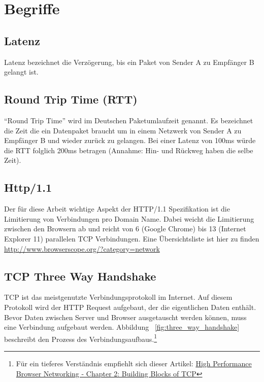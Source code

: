
\section{Begriffe}
\label{sec:begriffe}

	\subsection{Latenz} %
	\label{sub:latenz}
		Latenz bezeichnet die Verzögerung, bis ein Paket von Sender A zu Empfänger B gelangt ist.


	\subsection{Round Trip Time (RTT)} %
	\label{sub:round_trip_time_}
		"`Round Trip Time"' wird im Deutschen Paketumlaufzeit genannt. Es bezeichnet die Zeit die ein Datenpaket braucht um in einem Netzwerk von Sender A zu Empfänger B und wieder zurück zu gelangen. Bei einer Latenz von 100ms würde die RTT folglich 200ms betragen (Annahme: Hin- und Rückweg haben die selbe Zeit).
	


	\subsection{Http/1.1}
	\label{sub:http_1_1}
		Der für diese Arbeit wichtige Aspekt der HTTP/1.1 Spezifikation ist die Limitierung von Verbindungen pro Domain Name. Dabei weicht die Limitierung zwischen den Browsern ab und reicht von 6 (Google Chrome) bis 13 (Internet Explorer 11) parallelen TCP Verbindungen. Eine Übersichtsliste ist hier zu finden \url{http://www.browserscope.org/?category=network}


	\subsection{TCP Three Way Handshake}
	\label{sub:tcp_three_way_handshake}
		TCP ist das meistgenutzte Verbindungsprotokoll im Internet. Auf diesem Protokoll wird der HTTP Request aufgebaut, der die eigentlichen Daten enthält.
		Bevor Daten zwischen Server und Browser ausgetauscht werden können, muss eine Verbindung aufgebaut werden. Abbildung ~\ref{fig:three_way_handshake} beschreibt den Prozess des Verbindungsaufbaus.\footnote{Für ein tieferes Verständnis empfiehlt sich dieser Artikel: \href{http://chimera.labs.oreilly.com/books/1230000000545/ch02.html}{High Performance Browser Networking - Chapter 2: Building Blocks of TCP}} 

